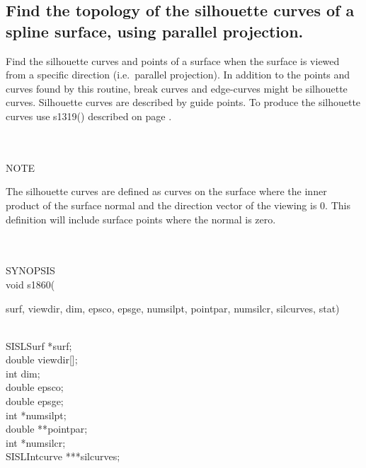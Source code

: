 \subsection{Find the topology of the silhouette curves of a spline surface,
using parallel projection.}
\begin{minipg1}
  Find the silhouette curves and points of a surface when the surface is viewed
  from a specific direction (i.e.\ parallel projection).
  In addition to the points and curves found by this routine, break
  curves and edge-curves might be silhouette curves.
  Silhouette curves are described by guide points.
  To produce the silhouette curves use s1319() described on page \pageref{s1319}.
\end{minipg1} \\ \\
NOTE\\
\>     \begin{minipg6}
The silhouette curves are defined as curves on the surface where the inner product of the surface normal and the direction vector of the viewing is 0. This definition will include surface points where the normal is zero.
\end{minipg6}\\ \\
SYNOPSIS\\
        \>void s1860(\begin{minipg3}
                {\fov surf}, {\fov viewdir}, {\fov dim}, {\fov epsco}, {\fov epsge}, {\fov numsilpt}, {\fov pointpar}, {\fov numsilcr}, {\fov silcurves},
                {\fov stat})
                \end{minipg3}\\[0.3ex]
                \>\>    SISLSurf        \>      *{\fov surf};\\
                \>\>    double  \>      {\fov viewdir}[];\\
                \>\>    int     \>      {\fov dim};\\
                \>\>    double  \>      {\fov epsco};\\
                \>\>    double  \>      {\fov epsge};\\
                \>\>    int     \>      *{\fov numsilpt};\\
                \>\>    double  \>      **{\fov pointpar};\\
                \>\>    int     \>      *{\fov numsilcr};\\
                \>\>    SISLIntcurve\>  ***{\fov silcurves};\\
